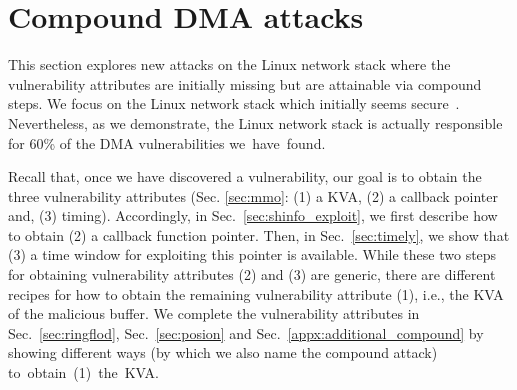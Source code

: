 \section{Compound DMA attacks}\label{sec:linux_net}



This section explores new attacks on the Linux network stack where the vulnerability attributes are initially missing but are attainable via compound steps.
We focus on the Linux network stack which initially seems secure~\cite{thunder}.
Nevertheless, as we demonstrate, the Linux network stack is actually responsible for 60\% of the DMA vulnerabilities \mbox{we have found.}

Recall that, once we have discovered a \subpage{} vulnerability, our goal is to obtain the three vulnerability attributes (Sec. \ref{sec:mmo}: (1) a KVA, (2) a callback pointer and, (3) timing). 
Accordingly, in Sec.~\ref{sec:shinfo_exploit}, we first describe how to obtain (2) a callback function pointer. Then, in Sec.~\ref{sec:timely}, we show that (3) a time window for exploiting this pointer is available. 
While these two steps for obtaining vulnerability attributes (2) and (3) are generic, there are different recipes for how to obtain the remaining vulnerability attribute (1), i.e., the KVA of the malicious buffer.
We complete the vulnerability attributes in Sec.~\ref{sec:ringflod}, Sec.~\ref{sec:posion} and Sec.~\ref{appx:additional_compound} by showing different ways (by which we also name the compound attack) \mbox{to obtain (1) the KVA.}



